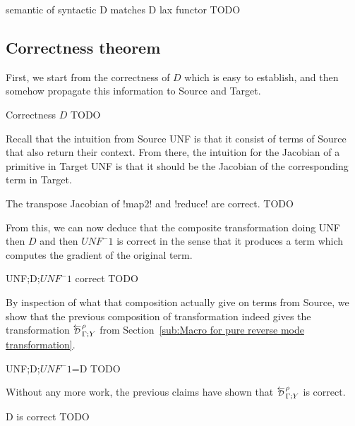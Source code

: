\begin{proposition}{semantic of syntactic D matches D lax functor}
    TODO
\end{proposition}


\subsection{Correctness theorem} %
\label{sub:Correctness theorem}

First, we start from the correctness of $D$ which is easy to establish, 
and then somehow propagate this information to Source and Target.

\begin{proposition}{Correctness $D$}
    TODO
\end{proposition}

Recall that the intuition from Source UNF is that it consist of terms of Source that also return their context.
From there, the intuition for the Jacobian of a primitive in Target UNF is that it should be the Jacobian of
the corresponding term in Target. 


\begin{proposition}{The transpose Jacobian of !map2! and !reduce! are correct.}
    TODO
\end{proposition}

From this, we can now deduce that the composite transformation doing UNF then $D$ and then $UNF^-1$ is correct
in the sense that it produces a term which computes the gradient of the original term.

\begin{theorem}{UNF;D;$UNF^-1$ correct}
    TODO
\end{theorem}

By inspection of what that composition actually give on terms from Source, 
we show that the previous composition of transformation indeed gives the transformation 
$\directD{\rho}{\Gamma}{Y}$ from Section~\ref{sub:Macro for pure reverse mode transformation}. 

\begin{proposition}{UNF;D;$UNF^-1$=D}
    TODO
\end{proposition}

Without any more work, the previous claims have shown that 
$\directD{\rho}{\Gamma}{Y}$ is correct.

\begin{theorem}{D is correct}
    TODO
\end{theorem}